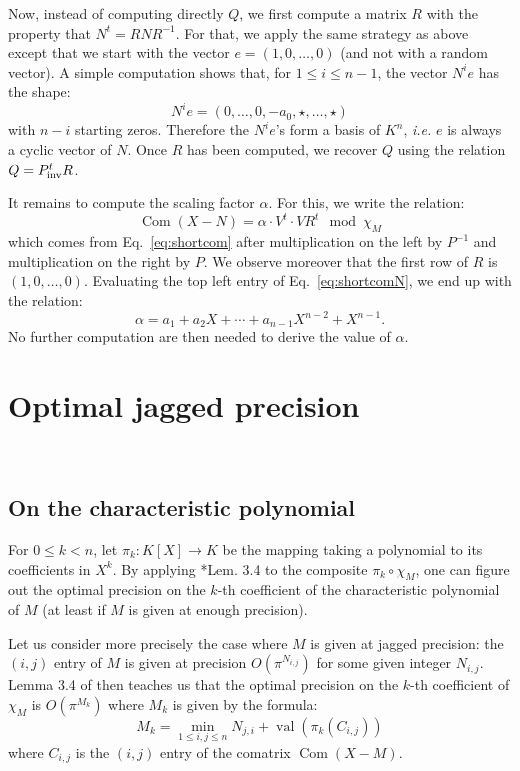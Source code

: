 \documentclass{sig-alternate-05-2015}
\DeclareMathOperator{\val}{val}
\DeclareMathOperator{\com}{Com}
\newcommand{\inv}{\text{\rm inv}}
\def\todo#1{\ \!\!{\color{red} #1}}
\begin{document}
Now, instead of computing directly $Q$, we first compute a matrix $R$ 
with the property that $N^t = R N R^{-1}$. For that, we apply the same
strategy as above except that we start with the vector $e = (1, 0, 
\ldots, 0)$ (and not with a random vector). A simple computation shows
that, for $1 \leq i \leq n{-}1$, the vector $N^i e$ has the shape:
$$N^i e = (0, \ldots, 0, -a_0, \star, \ldots, \star)$$
with $n{-}i$ starting zeros. Therefore the $N^i e$'s form a basis of
$K^n$, \emph{i.e.} $e$ is always a cyclic vector of $N$. Once $R$ has
been computed, we recover $Q$ using the relation $Q = P_\inv^t R$.

It remains to compute the scaling factor $\alpha$. For this, we write
the relation:
\begin{equation}
\label{eq:shortcomN}
\com(X{-}N) = \alpha \cdot V^t \cdot V R^t \mod \chi_M
\end{equation}
which comes from Eq.~\eqref{eq:shortcom} after multiplication on the 
left by $P^{-1}$ and multiplication on the right by $P$. We observe
moreover that the first row of $R$ is $(1, 0, \ldots, 0)$. Evaluating
the top left entry of Eq.~\eqref{eq:shortcomN}, we end up with the 
relation:
$$\alpha = a_1 + a_2 X + \cdots + a_{n-1} X^{n-2} + X^{n-1}.$$
No further computation are then needed to derive the value of $\alpha$.

\section{Optimal jagged precision}
\label{sec:optjagged}

\todo{Write a small introduction}

\subsection{On the characteristic polynomial}

For $0 \leq k < n$, let $\pi_k : K[X] \to K$ be the mapping taking a 
polynomial to its coefficients in $X^k$. By applying 
\cite{caruso-roe-vaccon:14a}*{Lem. 3.4} to the composite $\pi_k 
\circ \chi_M$, one can figure out the optimal precision on the
$k$-th coefficient of the characteristic polynomial of $M$ (at
least if $M$ is given at enough precision).

Let us consider more precisely the case where $M$ is given at 
jagged precision: the $(i,j)$ entry of $M$ is given at precision 
$O(\pi^{N_{i,j}})$ for some given integer $N_{i,j}$. 
Lemma 3.4 of \cite{caruso-roe-vaccon:14a} then teaches us that
the optimal precision on the $k$-th coefficient of $\chi_M$ is 
$O(\pi^{M_k})$ where $M_k$ is given by the formula:
\begin{equation}
\label{eq:optjagged}
M_k = \min_{1 \leq i, j\leq n} N_{j,i} + \val(\pi_k(C_{i,j}))
\end{equation}
where $C_{i,j}$ is the $(i,j)$ entry of the comatrix $\com(X{-}M)$.
\end{document}
